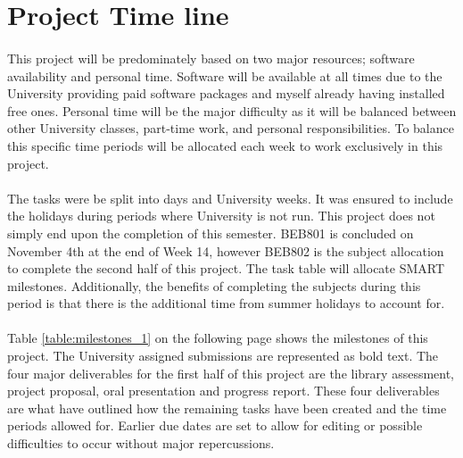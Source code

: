 \newpage
\section{Project Time line}

\paragraph{}
This project will be predominately based on two major resources; software availability and personal time. Software will be available at all times due to the University providing paid software packages and myself already having installed free ones. Personal time will be the major difficulty as it will be balanced between other University classes, part-time work, and personal responsibilities. To balance this specific time periods will be allocated each week to work exclusively in this project.    

\paragraph{}
The tasks were be split into days and University weeks. It was ensured to include the holidays during periods where University is not run. This project does not simply end upon the completion of this semester. BEB801 is concluded on November 4th at the end of Week 14, however BEB802 is the subject allocation to complete the second half of this project. The task table will allocate SMART milestones. Additionally, the benefits of completing the subjects during this period is that there is the additional time from summer holidays to account for.

\paragraph{}
Table \ref{table:milestones_1} on the following page shows the milestones of this project. The University assigned submissions are represented as bold text. The four major deliverables for the first half of this project are the library assessment, project proposal, oral presentation and progress report. These four deliverables are what have outlined how the remaining tasks have been created and the time periods allowed for. Earlier due dates are set to allow for editing or possible difficulties to occur without major repercussions. 

